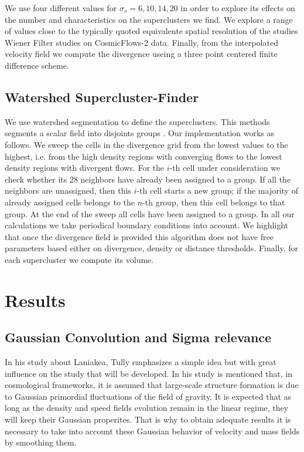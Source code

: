 \documentclass[usenatbib]{mnras}
\begin{document}
We use four different values for $\sigma_s=6, 10, 14, 20$ in order to explore its effects
on the number and characteristics on the superclusters we find.
We explore a range of values close to the typically quoted equivalente
spatial resolution of the studies Wiener Filter studies on
CosmicFlows-2 data.
Finally, from the interpolated velocity field we compute the
divergence useing a three point centered finite difference scheme.


\subsection{Watershed Supercluster-Finder}


We use watershed segmentation to define the superclusters.
This methods segments a scalar field into disjoints groups \citep{BeucherWatershed1979}.
Our implementation works as follows. 
We sweep the cells in the divergence grid from the lowest values to the highest, i.e. from
the high density regions with converging flows to the lowest density regions with divergent
flows.
For the $i$-th cell under consideration we check whether its 28 neighbors have already been assigned to a group. 
If all the neighbors are unassigned, then this $i$-th cell starts a
new group; if the majority of already assigned cells belongs to the
$n$-th group, then this cell belongs to that group.  
At the end of the sweep all cells have been assigned to a group. 
In all our calculations we take periodical boundary conditions into
account.  
We highlight that once the divergence field is provided this algorithm
does not have free parameters based either on divergence, density or distance thresholds. 
Finally, for each supercluster we compute its volume.


\section{Results}


\subsection{Gaussian Convolution and Sigma relevance}

In his study about Laniakea, Tully\cite{tully_laniakea_2014} emphasizes a simple idea but with great influence on the study that will be developed. In his study is mentioned that, in cosmological frameworks, it is assumed that large-scale structure formation is due to Gaussian primordial fluctuations of the field of gravity. It is expected that as long as the density and speed fields evolution remain in the linear regime, they will keep their Gaussian properites. That is why to obtain adequate results it is necessary to take into account these Gaussian behavior of velocity and mass fields by smoothing them.
\end{document}
